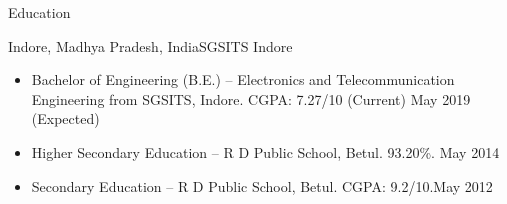 \documentclass[]{mcdowellcv}
\begin{document}
	\makeheader

	\begin{cvsection}{Education}
		\begin{cvsubsection}{Indore, Madhya Pradesh, India}{SGSITS Indore}{}
			\begin{itemize}
				\item Bachelor of Engineering (B.E.) -- Electronics and Telecommunication Engineering from SGSITS, Indore.     CGPA: 7.27/10 (Current) \hfill May 2019 (Expected)
				\item Higher Secondary Education -- R D Public School, Betul. 93.20\%. \hfill May 2014
				\item Secondary Education -- R D Public School, Betul. CGPA: 9.2/10.\hfill May 2012
			\end{itemize}
		\end{cvsubsection}
	\end{cvsection}
\end{document}

